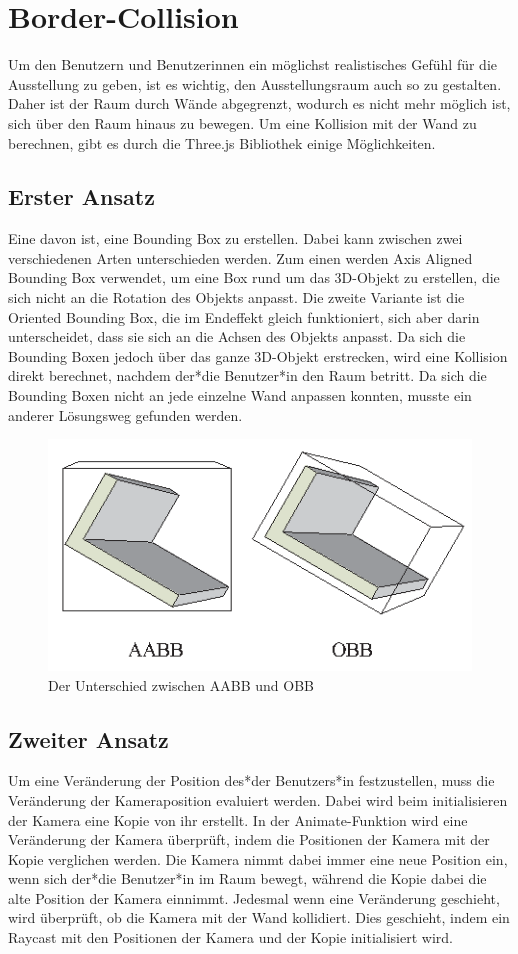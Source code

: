 \section{Border-Collision}

Um den Benutzern und Benutzerinnen ein möglichst realistisches Gefühl für die Ausstellung zu geben, ist es wichtig, den Ausstellungsraum auch so zu gestalten. Daher ist der Raum durch Wände abgegrenzt, wodurch es nicht mehr möglich ist, sich über den Raum hinaus zu bewegen. 
Um eine Kollision mit der Wand zu berechnen, gibt es durch die Three.js Bibliothek einige Möglichkeiten.
\subsection{Erster Ansatz}
Eine davon ist, eine Bounding Box zu erstellen. Dabei kann zwischen zwei verschiedenen Arten unterschieden werden. Zum einen werden Axis Aligned Bounding Box verwendet, um eine Box rund um das 3D-Objekt zu erstellen, die sich nicht an die Rotation des Objekts anpasst. Die zweite Variante ist die Oriented Bounding Box, die im Endeffekt gleich funktioniert, sich aber darin unterscheidet, dass sie sich an die Achsen des Objekts anpasst. Da sich die Bounding Boxen jedoch über das ganze 3D-Objekt erstrecken, wird eine Kollision direkt berechnet, nachdem der*die Benutzer*in den Raum betritt. Da sich die Bounding Boxen nicht an jede einzelne Wand anpassen konnten, musste ein anderer Lösungsweg gefunden werden.
\begin{figure}
    \centering
    \includegraphics[scale=0.65]{pics/aabb_obb.png}
    \caption{Der Unterschied zwischen AABB und OBB}
    \label{fig:impl:aabb_obb}
\end{figure}

\subsection{Zweiter Ansatz}
Um eine Veränderung der Position des*der Benutzers*in festzustellen, muss die Veränderung der Kameraposition evaluiert werden. Dabei wird beim initialisieren der Kamera eine Kopie von ihr erstellt. In der Animate-Funktion wird eine Veränderung der Kamera überprüft, indem die Positionen der Kamera mit der Kopie verglichen werden. Die Kamera nimmt dabei immer eine neue Position ein, wenn sich der*die Benutzer*in im Raum bewegt, während die Kopie dabei die alte Position der Kamera einnimmt.    
Jedesmal wenn eine Veränderung geschieht, wird überprüft, ob die Kamera mit der Wand kollidiert. Dies geschieht, indem ein Raycast mit den Positionen der Kamera und der Kopie initialisiert wird. 
